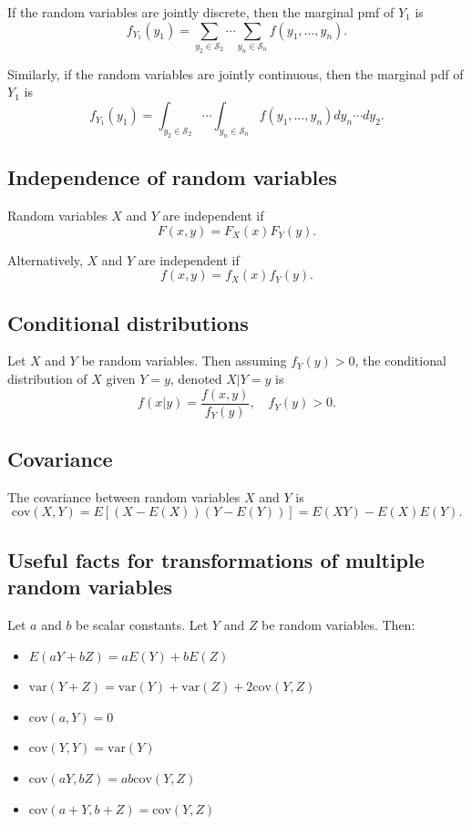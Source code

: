 \documentclass[
]{book}
\providecommand{\tightlist}{%
  \setlength{\itemsep}{0pt}\setlength{\parskip}{0pt}}
\theoremstyle{definition}
\theoremstyle{definition}
\theoremstyle{definition}
\theoremstyle{definition}
\theoremstyle{remark}
\begin{document}
If the random variables are jointly discrete, then the marginal pmf of \(Y_1\) is
\[f_{Y_1}(y_1)=\sum_{y_2\in\mathcal{S}_2}\cdots \sum_{y_n\in\mathcal{S}_n} f(y_1,\ldots,y_n).\]

Similarly, if the random variables are jointly continuous, then the marginal pdf of \(Y_1\) is \[
f_{Y_1}(y_1)=\int_{y_2\in\mathcal{S}_2}\cdots \int_{y_n\in\mathcal{S}_n} f(y_1,\ldots,y_n) dy_n \cdots dy_2.
\]

\hypertarget{independence-of-random-variables}{%
\subsection{Independence of random variables}\label{independence-of-random-variables}}

Random variables \(X\) and \(Y\) are independent if
\[F(x, y) = F_X(x) F_Y(y).\]

Alternatively, \(X\) and \(Y\) are independent if
\[f(x, y) = f_X(x)f_Y(y).\]

\hypertarget{conditional-distributions}{%
\subsection{Conditional distributions}\label{conditional-distributions}}

Let \(X\) and \(Y\) be random variables. Then assuming \(f_Y(y)>0\), the conditional distribution of \(X\) given \(Y = y\), denoted \(X|Y=y\) is
\[f(x|y) = \frac{f(x, y)}{f_{Y}(y)}, \quad f_Y(y)>0.\]

\hypertarget{covariance}{%
\subsection{Covariance}\label{covariance}}

The covariance between random variables \(X\) and \(Y\) is
\[\mathrm{cov}(X,Y)=E[(X-E(X))(Y-E(Y))]=E(XY)-E(X)E(Y).\]

\hypertarget{useful-facts-for-transformations-of-multiple-random-variables}{%
\subsection{Useful facts for transformations of multiple random variables}\label{useful-facts-for-transformations-of-multiple-random-variables}}

Let \(a\) and \(b\) be scalar constants. Let \(Y\) and \(Z\) be random variables. Then:

\begin{itemize}
\tightlist
\item
  \(E(aY+bZ)=aE(Y)+bE(Z)\)
\item
  \(\mathrm{var}(Y+Z)=\mathrm{var}(Y)+\mathrm{var}(Z)+2\mathrm{cov}(Y, Z)\)
\item
  \(\mathrm{cov}(a,Y)=0\)
\item
  \(\mathrm{cov}(Y,Y)=\mathrm{var}(Y)\)
\item
  \(\mathrm{cov}(aY, bZ)=ab\mathrm{cov}(Y, Z)\)
\item
  \(\mathrm{cov}(a + Y,b + Z)=\mathrm{cov}(Y, Z)\)
\end{itemize}
\end{document}
